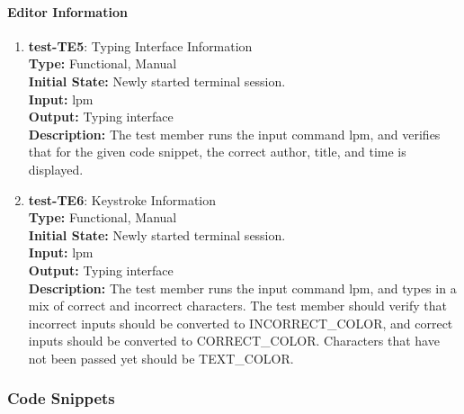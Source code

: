 \documentclass[12pt, titlepage]{article}
\begin{document}
\paragraph{Editor Information}

\begin{enumerate}
\item{\textbf{test-TE5}: Typing Interface Information\\}
\textbf{Type:} Functional, Manual \\
\textbf{Initial State:} Newly started terminal session. \\
\textbf{Input:} lpm \\
\textbf{Output:} Typing interface \\
\textbf{Description:} The test member runs the input command lpm, and verifies that for the given code snippet, the correct author, title, and time is displayed. \\

\item{\textbf{test-TE6}: Keystroke Information\\}
\textbf{Type:} Functional, Manual \\
\textbf{Initial State:} Newly started terminal session. \\
\textbf{Input:} lpm \\
\textbf{Output:} Typing interface \\
\textbf{Description:} The test member runs the input command lpm, and types in a mix of correct and incorrect characters. The test member should verify that incorrect inputs should be converted to INCORRECT\_COLOR, and correct inputs should be converted to CORRECT\_COLOR. Characters that have not been passed yet should be TEXT\_COLOR. \\
\end{enumerate}

\subsubsection{Code Snippets}
\end{document}
